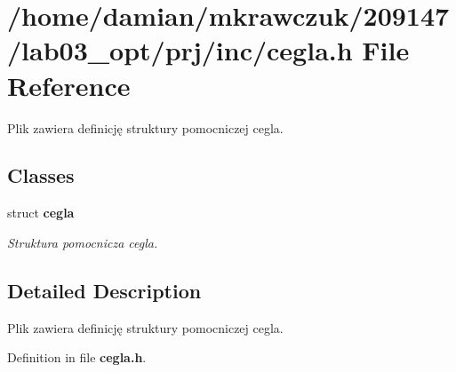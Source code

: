 \section{/home/damian/mkrawczuk/209147/lab03\-\_\-opt/prj/inc/cegla.h File Reference}
\label{cegla_8h}


Plik zawiera definicję struktury pomocniczej cegla.  


\subsection*{Classes}
\begin{DoxyCompactItemize}
\item 
struct {\bf cegla}
\begin{DoxyCompactList}\small\item\em Struktura pomocnicza cegla. \end{DoxyCompactList}\end{DoxyCompactItemize}


\subsection{Detailed Description}
Plik zawiera definicję struktury pomocniczej cegla. 

Definition in file {\bf cegla.\-h}.

